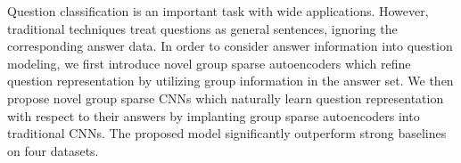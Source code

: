 Question classification is an important task with wide applications. However, traditional techniques treat questions as general sentences, ignoring the corresponding answer data. In order to consider answer information into question modeling, we first introduce novel group sparse autoencoders which refine question representation by utilizing group information in the answer set. We then propose novel group sparse CNNs which naturally learn question representation with respect to their answers by implanting group sparse autoencoders into traditional CNNs. The proposed model significantly outperform strong baselines on four datasets.
